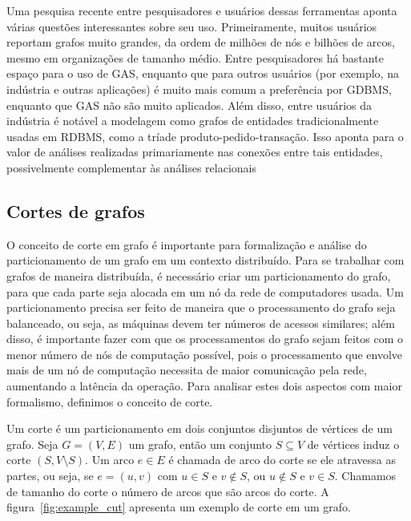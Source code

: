 \documentclass[conference]{IEEEtran}
\begin{document}
Uma pesquisa recente entre pesquisadores e usuários dessas ferramentas
\cite{sahu} aponta várias questões interessantes sobre seu uso. Primeiramente,
muitos usuários reportam grafos muito grandes, da ordem de milhões de nós e
bilhões de arcos, mesmo em organizações de tamanho médio. Entre pesquisadores
há bastante espaço para o uso de GAS, enquanto que para outros usuários
(por exemplo, na indústria e outras aplicações) é muito mais comum a
preferência por GDBMS, enquanto que GAS não são muito aplicados. Além disso,
entre usuários da indústria é notável a modelagem como grafos de entidades
tradicionalmente usadas em RDBMS, como a tríade
{\ttfamily produto-pedido-transação}. Isso aponta para o valor de análises
realizadas primariamente nas conexões entre tais entidades, possivelmente
complementar às análises relacionais


\subsection{Cortes de grafos}
O conceito de corte em grafo é importante para formalização e análise
do particionamento de um grafo em um contexto distribuído. Para se
trabalhar com grafos de maneira distribuída, é necessário criar um
particionamento do grafo, para que cada parte seja alocada em um nó da
rede de computadores usada. Um particionamento precisa ser feito de
maneira que o processamento do grafo seja balanceado, ou seja, as
máquinas devem ter números de acessos similares; além disso, é
importante fazer com que os processamentos do grafo sejam feitos com o
menor número de nós de computação possível, pois o processamento que
envolve mais de um nó de computação necessita de maior comunicação pela
rede, aumentando a latência da operação. Para analisar estes dois
aspectos com maior formalismo, definimos o conceito de corte.

Um corte é um particionamento em dois conjuntos disjuntos de vértices de
um grafo. Seja $G = (V, E)$ um grafo, então um conjunto $S \subseteq V$
de vértices induz o corte $(S, V \setminus S)$. Um arco $e \in E$ é
chamada de arco do corte se ele atravessa as partes, ou seja, se
$e = (u, v)$ com $u \in S$ e $v \notin S$, ou $u \notin S$ e $v \in S$.
Chamamos de tamanho do corte o número de arcos que são arcos do corte. A
figura~\ref{fig:example_cut} apresenta um exemplo de corte em um grafo.
\end{document}
